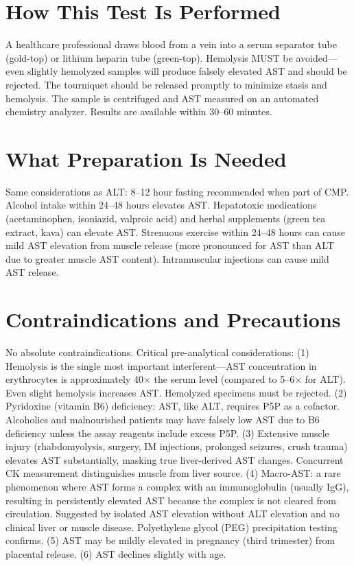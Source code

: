 \section*{How This Test Is Performed}
A healthcare professional draws blood from a vein into a serum separator tube (gold-top) or lithium heparin tube (green-top). Hemolysis MUST be avoided---even slightly hemolyzed samples will produce falsely elevated AST and should be rejected. The tourniquet should be released promptly to minimize stasis and hemolysis. The sample is centrifuged and AST measured on an automated chemistry analyzer. Results are available within 30--60 minutes.

\section*{What Preparation Is Needed}
Same considerations as ALT: 8--12 hour fasting recommended when part of CMP. Alcohol intake within 24--48 hours elevates AST. Hepatotoxic medications (acetaminophen, isoniazid, valproic acid) and herbal supplements (green tea extract, kava) can elevate AST. Strenuous exercise within 24--48 hours can cause mild AST elevation from muscle release (more pronounced for AST than ALT due to greater muscle AST content). Intramuscular injections can cause mild AST release.

\section*{Contraindications and Precautions}
No absolute contraindications. Critical pre-analytical considerations: (1) Hemolysis is the single most important interferent---AST concentration in erythrocytes is approximately 40$\times$ the serum level (compared to 5--6$\times$ for ALT). Even slight hemolysis increases AST. Hemolyzed specimens must be rejected. (2) Pyridoxine (vitamin B6) deficiency: AST, like ALT, requires P5P as a cofactor. Alcoholics and malnourished patients may have falsely low AST due to B6 deficiency unless the assay reagents include excess P5P. (3) Extensive muscle injury (rhabdomyolysis, surgery, IM injections, prolonged seizures, crush trauma) elevates AST substantially, masking true liver-derived AST changes. Concurrent CK measurement distinguishes muscle from liver source. (4) Macro-AST: a rare phenomenon where AST forms a complex with an immunoglobulin (usually IgG), resulting in persistently elevated AST because the complex is not cleared from circulation. Suggested by isolated AST elevation without ALT elevation and no clinical liver or muscle disease. Polyethylene glycol (PEG) precipitation testing confirms. (5) AST may be mildly elevated in pregnancy (third trimester) from placental release. (6) AST declines slightly with age.

